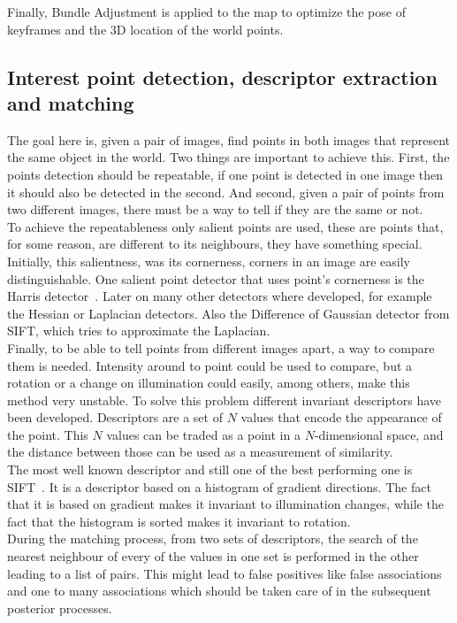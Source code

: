 Finally, Bundle Adjustment is applied to the map to optimize the pose of keyframes and the 3D location of the world points.\\


\subsection{Interest point detection, descriptor extraction and matching}
\label{ssub:interest_point_detection_descriptor_extraction_and_matching}

The goal here is, given a pair of images, find points in both images that represent the same object in the world. Two things are important to achieve this. First, the points detection should be repeatable, if one point is detected in one image then it should also be detected in the second. And second, given a pair of points from two different images, there must be a way to tell if they are the same or not.\\

To achieve the repeatableness only salient points are used, these are points that, for some reason, are different to its neighbours, they have something special. Initially, this salientness, was its cornerness, corners in an image are easily distinguishable. One salient point detector that uses point's cornerness is the Harris detector~\cite{harris1988combined}. Later on many other detectors where developed, for example the Hessian or Laplacian detectors. Also the Difference of Gaussian detector from SIFT, which tries to approximate the Laplacian.\\

Finally, to be able to tell points from different images apart, a way to compare them is needed. Intensity around to point could be used to compare, but a rotation or a change on illumination could easily, among others, make this method very unstable. To solve this problem different invariant descriptors have been developed. Descriptors are a set of $N$ values that encode the appearance of the point. This $N$ values can be traded as a point in a $N$-dimensional space, and the distance between those can be used as a measurement of similarity.\\

The most well known descriptor and still one of the best performing one is SIFT~\cite{lowe2004distinctive}. It is a descriptor based on a histogram of gradient directions. The fact that it is based on gradient makes it invariant to illumination changes, while the fact that the histogram is sorted makes it invariant to rotation.\\

During the matching process, from two sets of descriptors, the search of the nearest neighbour of every of the values in one set is performed in the other leading to a list of pairs. This might lead to false positives like false associations and one to many associations which should be taken care of in the subsequent posterior processes.\\





